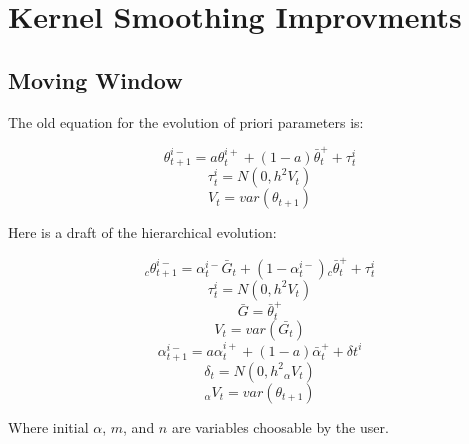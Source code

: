 \chapter{Kernel Smoothing Improvments}



\section{Moving Window}

The old equation for the evolution of priori parameters is:

\begin{equation}\label{eq:dekf_thetaminus}
\theta_{t+1}^{i-} = a\theta_{t}^{i+} + (1-a)\bar{\theta}_{t}^{+} + \tau_{t}^{i}
\end{equation}
\begin{equation}\label{eq:dekf_tau}
\tau_{t}^{i} = N(0, h^{2}V_{t})
\end{equation}
\begin{equation}\label{eq:dekf_V}
V_{t} = var(\theta_{t+1})
\end{equation}

Here is a draft of the hierarchical evolution:

\begin{equation}\label{eq:dekf_thetanew}
{}_{c}\theta_{t+1}^{i-} = \alpha_{t}^{i-}\bar{G}_{t} + (1-\alpha_{t}^{i-}){}_{c}\bar{\theta}_{t}^{+} + \tau_{t}^{i}
\end{equation}
\begin{equation}\label{eq:dekf_tau_2}
\tau_{t}^{i} = N(0, h^{2}V_{t})
\end{equation}
\begin{equation}\label{eq:dekf_G}
\bar{G} = \bar{\theta}_{t}^{+}
\end{equation}
\begin{equation}\label{eq:dekf_V_2}
V_{t} = var(\bar{G_{t}})
\end{equation}
\begin{equation}\label{eq:dekf_V_3}
\alpha_{t+1}^{i-} = a\alpha_{t}^{i+} + (1-a)\bar{\alpha}_{t}^{+} + \delta{t}^{i}
\end{equation}
\begin{equation}\label{eq:dekf_V_4}
\delta_{t} = N(0, h^{2}{}_{\alpha}V_{t})
\end{equation}
\begin{equation}\label{eq:dekf_V_5}
{}_{\alpha}V_{t} = var(\theta_{t+1})
\end{equation}

Where initial $\alpha$, $m$, and $n$ are variables choosable by the user.